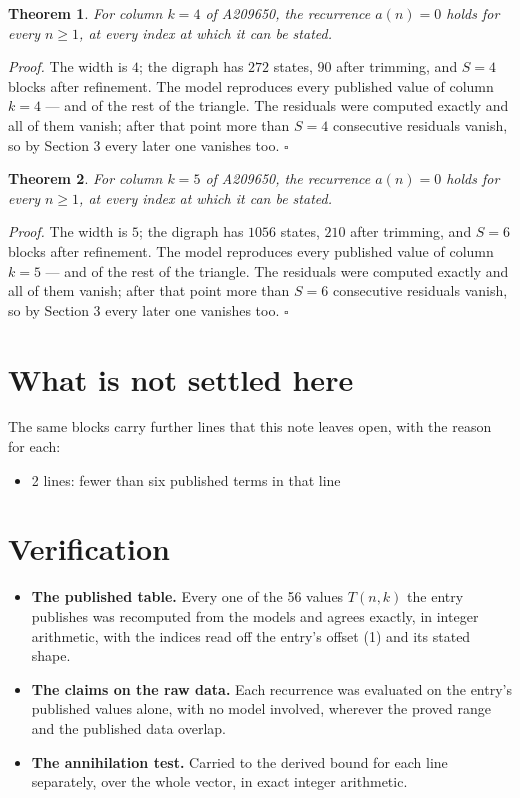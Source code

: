 \documentclass[11pt]{article}
\newtheorem{theorem}{Theorem}
\theoremstyle{definition}
\begin{document}
\begin{theorem} For column $k = 4$ of A209650, the recurrence $a(n) = 0$ holds for every $n \ge 1$, at every index at which it can be stated.\end{theorem}

{\itshape Proof.} The width is $4$; the digraph has $272$ states, $90$ after trimming, and $S = 4$ blocks after refinement. The model reproduces every published value of column $k = 4$ --- and of the rest of the triangle. The residuals were computed exactly and all of them vanish; after that point more than $S = 4$ consecutive residuals vanish, so by Section 3 every later one vanishes too. $\square$

\begin{theorem} For column $k = 5$ of A209650, the recurrence $a(n) = 0$ holds for every $n \ge 1$, at every index at which it can be stated.\end{theorem}

{\itshape Proof.} The width is $5$; the digraph has $1056$ states, $210$ after trimming, and $S = 6$ blocks after refinement. The model reproduces every published value of column $k = 5$ --- and of the rest of the triangle. The residuals were computed exactly and all of them vanish; after that point more than $S = 6$ consecutive residuals vanish, so by Section 3 every later one vanishes too. $\square$

\section{What is not settled here}

The same blocks carry further lines that this note leaves open, with the reason for each:

\begin{itemize}

\item 2 lines: fewer than six published terms in that line

\end{itemize}

\section{Verification}

\begin{itemize}

\item {\bfseries The published table.} Every one of the 56 values $T(n,k)$ the entry publishes was recomputed from the models and agrees exactly, in integer arithmetic, with the indices read off the entry's offset (1) and its stated shape.

\item {\bfseries The claims on the raw data.} Each recurrence was evaluated on the entry's published values alone, with no model involved, wherever the proved range and the published data overlap.

\item {\bfseries The annihilation test.} Carried to the derived bound for each line separately, over the whole vector, in exact integer arithmetic.

\end{itemize}
\end{document}
